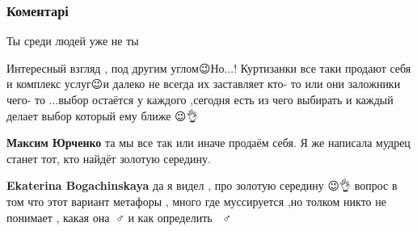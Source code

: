  
 
 
 
 
\subsubsection{Коментарі}

\begin{itemize}
 
Ты среди людей уже не ты

 

Интересный взгляд , под другим углом😉Но...! Куртизанки все таки продают себя и
комплекс услуг😉и далеко не всегда их заставляет кто- то или они заложники
чего- то ...выбор остаётся у каждого ,сегодня есть из чего выбирать и каждый
делает выбор который ему ближе 😉👌

\begin{itemize}
 
\textbf{Максим Юрченко} та мы все так или иначе продаём себя. Я же написала мудрец станет тот, кто найдёт золотую середину.

 
\textbf{Ekaterina Bogachinskaya} да я видел , про золотую середину 😉👌 вопрос в том что этот вариант метафоры , много где муссируется ,но толком никто не понимает , какая она🤷🏻♂️ и как определить 🤷🏻♂️


\end{itemize}
\end{itemize}
